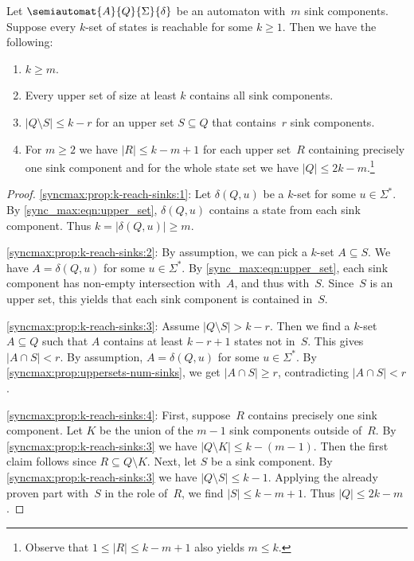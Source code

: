 \begin{proposition} \label{syncmax:prop:uppersets-num-sinks-size-Q} 
	\label{sync_max:prop:upper_sets_allk-sets}
	\label{constrsync:prop:upper_sets:item:Si}
	Let $\semiautomat{A}{Q}{\Sigma}{\delta}$ be an automaton with~$m$ sink components.
	Suppose every $k$-set of states is reachable for some $k \ge 1$. Then we have the following:
	
	\begin{enumerate}
		\item \label{syncmax:prop:k-reach-sinks:1} $k \ge m$.
		
		\item \label{syncmax:prop:k-reach-sinks:2} Every upper set of size at least $k$ contains all sink components.
		
		\item \label{syncmax:prop:k-reach-sinks:3} $|Q \setminus S| \le k - r$ for an upper 
		set $S \subseteq Q$ that contains~$r$ sink components.
		
		\item \label{syncmax:prop:k-reach-sinks:4} For $m \ge 2$ we have 
		$|R| \le k - m + 1$ for each upper set~$R$ containing precisely one sink component
		and for the whole state set we have $|Q| \le 2k - m$.\footnote{Observe
		that $1 \le |R| \le k - m + 1$ also yields $m \le k$.}
	\end{enumerate}
\end{proposition} 
\begin{proof}
\ref{syncmax:prop:k-reach-sinks:1}: Let $\delta(Q, u)$ be a $k$-set for some $u \in \Sigma^*$.
 By \cref{sync_max:eqn:upper_set}, $\delta(Q, u)$ contains a state from each sink component.
 Thus $k = |\delta(Q, u)| \ge m$.

\ref{syncmax:prop:k-reach-sinks:2}: By assumption, we can pick a $k$-set $A \subseteq S$.
 We have $A = \delta(Q, u)$ for some $u \in \Sigma^*$.
 By \cref{sync_max:eqn:upper_set}, each sink component has non-empty intersection with~$A$,
 and thus with~$S$. Since~$S$ is an upper set, this yields that each
 sink component is contained in~$S$.

\ref{syncmax:prop:k-reach-sinks:3}: Assume $|Q \setminus S| > k - r$.
  Then we find a $k$-set $A \subseteq Q$
  such that $A$ contains at least $k - r + 1$ states not in~$S$.
  This gives $|A \cap S| < r$.
  By assumption, $A = \delta(Q, u)$ for some $u \in \Sigma^*$.
  By \cref{syncmax:prop:uppersets-num-sinks}, we get $|A \cap S| \ge r$,
  contradicting $|A \cap S| < r$.
  
\ref{syncmax:prop:k-reach-sinks:4}: First, suppose~$R$ contains precisely one sink component. 
Let $K$ be the union of the $m-1$ sink components
outside of~$R$.
By \cref{syncmax:prop:k-reach-sinks:3} we have $|Q \setminus K| \le k - (m - 1)$.
Then the first claim follows since $R \subseteq Q \setminus K$.
 Next, let $S$ be a sink component. By \cref{syncmax:prop:k-reach-sinks:3} 
 we have $|Q \setminus S| \le k-1$.
 Applying the already proven part with~$S$ in the role of~$R$,
 we find $|S| \le k - m + 1$.
 Thus $|Q| \le 2k - m$.
\end{proof}
	
